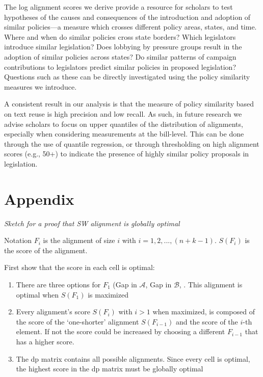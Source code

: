 \documentclass[12pt]{article} %
\begin{document}
The log alignment scores we derive provide a resource for scholars to test hypotheses of the causes and consequences of the introduction and adoption of similar policies---a measure which crosses different policy areas, states, and time. Where and when do similar policies cross state borders? Which legislators introduce similar legislation? Does lobbying by pressure groups result in the adoption of similar policies across states? Do similar patterns of campaign contributions to legislators predict similar policies in proposed legislation? Questions such as these can be directly investigated using the policy similarity measures we introduce. 

A consistent result in our analysis is that the measure of policy similarity based on text reuse is high precision and low recall.  As such, in future research we advise scholars to focus on upper quantiles of the distribution of alignments, especially when considering measurements at the bill-level. This can be done through the use of quantile regression, or through thresholding on high alignment scores (e.g., 50+) to indicate the presence of highly similar policy proposals in legislation.





\clearpage

\section*{Appendix}

\textit{Sketch for a proof that SW alignment is globally optimal}

Notation $F_i$ is the alignment of size $i$ with $i = 1,2,...,(n + k - 1)$. $S(F_i)$ is the score of the alignment.

First show that the score in each cell is optimal:
\begin{enumerate}
\item There are three options for $F_1$ (Gap in $\mathcal{A}$, Gap in $\mathcal{B}$, . This alignment is optimal when $S(F_1)$ is maximized
\item Every alignment's score $S(F_i)$ with $i > 1$ when maximized, is composed of the score of the `one-shorter' alignment $S(F_{i-1})$ and the score of the $i$-th element. If not the score could be increased by choosing a different $F_{i-1}$ that has a higher score.
\item The dp matrix contains all possible alignments. Since every cell is optimal, the highest score in the dp matrix must be globally optimal
\end{enumerate}
\end{document}
